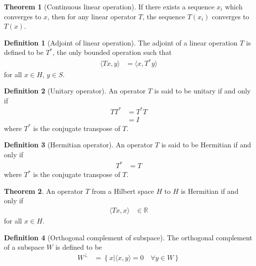 \documentclass[titlepage, fleqn, a4paper, 12pt, twoside]{article}
\theoremstyle{definition}
\newtheorem{definition}{Definition}
\theoremstyle{theorem}
\newtheorem{theorem}{Theorem}
\begin{document}
\begin{theorem}[Continuous linear operation]
	If there exists a sequence $x_i$ which converges to $x$, then for any linear operator $T$, the sequence $T(x_i)$ converges to $T(x)$.
\end{theorem}

\begin{definition}[Adjoint of linear operation]
	The adjoint of a linear operation $T$ is defined to be $T^*$, the only bounded operation such that
	\begin{align*}
		\langle T x , y \rangle &= \langle x , T^* y \rangle
	\end{align*}
	for all $x \in H$, $y \in S$.\\
\end{definition}

\begin{definition}[Unitary operator]
	An operator $T$ is said to be unitary if and only if
	\begin{align*}
		T T^* &= T^* T\\
		&= I
	\end{align*}
	where $T^*$ is the conjugate transpose of $T$.
\end{definition}

\begin{definition}[Hermitian operator]
	An operator $T$ is said to be Hermitian if and only if
	\begin{align*}
		T^* &= T
	\end{align*}
	where $T^*$ is the conjugate transpose of $T$.
\end{definition}

\begin{theorem}
	An operator $T$ from a Hilbert space $H$ to $H$ is Hermitian if and only if
	\begin{align*}
		\langle T x , x \rangle &\in \mathbb{R}
	\end{align*}
	for all $x \in H$.
\end{theorem}

\begin{definition}[Orthogonal complement of subspace]
	The orthogonal complement of a subspace $W$ is defined to be
	\begin{align*}
		W^{\perp} &= \left\{ x \Big| \langle x,y \rangle = 0 \quad \forall y \in W \right\}
	\end{align*}
\end{definition}
\end{document}
